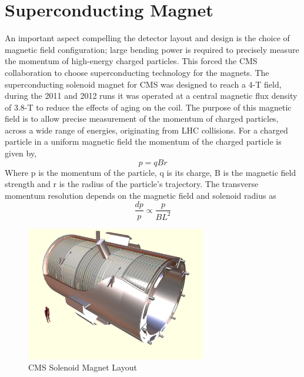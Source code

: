 \section{Superconducting Magnet}
An important aspect compelling the detector layout and design is the choice of 
magnetic field configuration; large bending power is required to precisely 
measure the momentum of high-energy charged particles. This forced the CMS
collaboration to choose superconducting technology for the magnets.
The superconducting solenoid magnet for CMS was designed to reach a 4-T field,
during the 2011 and 2012 runs it was operated at a central magnetic flux
density of 3.8-T to reduce the effects of aging on the coil. %
The purpose of this magnetic field is to allow precise measurement of the 
momentum of charged particles, across a wide range of energies, originating from LHC collisions. 
For a charged particle in a uniform magnetic field the  momentum of the charged particle is given by,
\begin{displaymath}
p=qBr
\end{displaymath}  
Where p is the momentum of the particle, q is its charge, B is the 
magnetic field strength and r is the radius of the particle's trajectory.
The transverse momentum resolution depends on the magnetic field and
solenoid radius as
\begin{displaymath}
\frac{dp}{p}\propto\frac{p}{BL^{2}}
\end{displaymath}
\begin{figure}[hb]
  \centering
	\includegraphics[width=0.7\textwidth]{ECALimages/magnet.png}
  	\caption[CMS Solenoid Magnet Layout]
   	{CMS Solenoid Magnet Layout}
	\label{fig:magnetLayout}
\end{figure}
